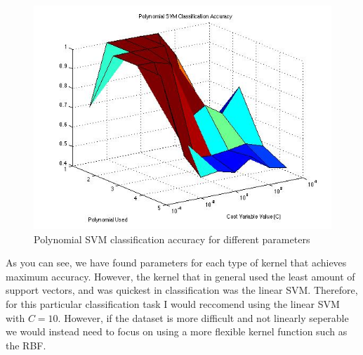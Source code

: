 \documentclass[paper=a4, fontsize=11pt]{scrartcl} %
\begin{document}
\begin{figure}
\centering
\includegraphics[scale=0.4]{Ploy.jpg}
\caption{Polynomial SVM classification accuracy for different parameters }
\label{fig:plot_2d}
\end{figure}

As you can see, we have found parameters for each type of kernel that achieves maximum accuracy. 
However, the kernel that in general used the least amount of support vectors, and was quickest in classification was the linear SVM.
Therefore, for this particular classification task I would reccomend using the linear SVM with $C=10$.
However, if the dataset is more difficult and not linearly seperable we would instead need to focus on using a more flexible kernel function such as the RBF.
\end{document}

